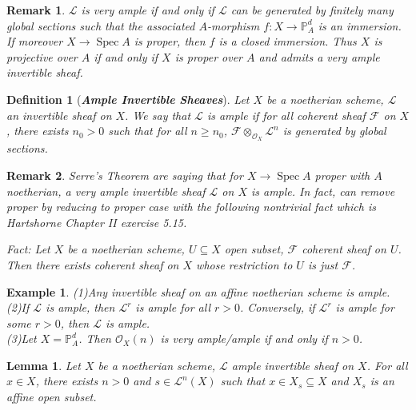 \documentclass{ctexart}
\newtheorem{definition}{Definition}[section]
\newtheorem{remark}{Remark}[section]
\newtheorem{lemma}{Lemma}[section]
\newtheorem{example}{Example}[section]
\newcommand{\spec}{\operatorname{Spec}}
\begin{document}
\begin{remark}
    $\mathcal{L}$ is very ample if and only if $\mathcal{L}$ can be generated by finitely many global sections such that the associated $A$-morphism $f: X \longrightarrow \mathbb{P}_{A}^{d}$ is an immersion.
    If moreover $X \longrightarrow \spec A$ is proper, then $f$ is a closed immersion.
    Thus $X$ is projective over $A$ if and only if $X$ is proper over $A$ and admits a very ample invertible sheaf.
\end{remark}
\begin{definition}[\textbf{\emph{Ample Invertible Sheaves}}]
    Let $X$ be a noetherian scheme, $\mathcal{L}$ an invertible sheaf on $X$.
    We say that $\mathcal{L}$ is ample if for all coherent sheaf $\mathcal{F}$ on $X$,
    there exists $n_{0} > 0$ such that for all $n \ge n_{0}$, $\mathcal{F} \otimes_{\mathcal{O}_{X}} \mathcal{L}^{n}$ is generated by global sections.
\end{definition}
\begin{remark}
    Serre's Theorem are saying that for $X \longrightarrow \spec A$ proper with $A$ noetherian,
    a very ample invertible sheaf $\mathcal{L}$ on $X$ is ample.
    In fact, can remove proper by reducing to proper case with the following nontrivial fact which is Hartshorne Chapter II exercise 5.15.
    \par
    Fact: Let $X$ be a noetherian scheme, $U \subseteq X$ open subset, $\mathcal{F}$ coherent sheaf on $U$.
    Then there exists coherent sheaf on $X$ whose restriction to $U$ is just $\mathcal{F}$.
\end{remark}
\begin{example}
    (1)Any invertible sheaf on an affine noetherian scheme is ample. \\
    (2)If $\mathcal{L}$ is ample, then $\mathcal{L}^{r}$ is ample for all $r > 0$. 
    Conversely, if $\mathcal{L}^{r}$ is ample for some $r > 0$, then $\mathcal{L}$ is ample. \\
    (3)Let $X = \mathbb{P}_{A}^{d}$.
    Then $\mathcal{O}_{X}(n)$ is very ample/ample if and only if $n > 0$.
\end{example}
\begin{lemma}
    Let $X$ be a noetherian scheme, $\mathcal{L}$ ample invertible sheaf on $X$.
    For all $x\in X$, there exists $n > 0$ and $s\in \mathcal{L}^{n}(X)$ such that $x\in X_{s} \subseteq X$ and $X_{s}$ is an affine open subset.
    \label{Lemma 6.5}
\end{lemma}
\end{document}

